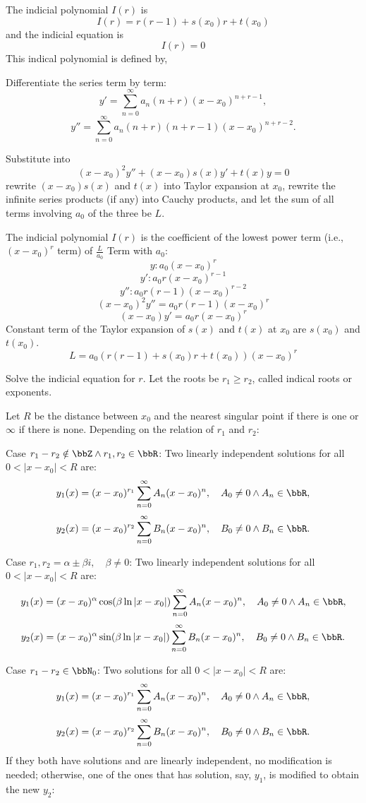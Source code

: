 \documentclass[a4paper,12pt]{report}
\begin{document}
\item The indicial polynomial $I(r)$ is
\[I(r)=r(r-1)+s(x_0)r+t(x_0)\]
and the indicial equation is
\[I(r)=0\]
This indical polynomial is defined by,
\bit
\item Differentiate the series term by term:
\[y'=\sum_{n=0}^{\infty}a_n(n+r)(x-x_0)^{n+r-1},\]
\[y''=\sum_{n=0}^{\infty}a_n(n+r)(n+r-1)(x-x_0)^{n+r-2}.\]
\item Substitute into
\[(x-x_0)^2y''+(x-x_0)s(x)y'+t(x)y=0\]
rewrite $(x-x_0)s(x)$ and $t(x)$ into Taylor expansion at $x_0$, rewrite the infinite series products (if any) into Cauchy products, and let the sum of all terms involving $a_0$ of the three be $L$.
\item The indicial polynomial $I(r)$ is the coefficient of the lowest power term (i.e., $(x-x_0)^r$ term) of $\frac{L}{a_0}$
\eit
\bpr
Term with $a_0$:
\[y\colon a_0(x-x_0)^r\]
\[y'\colon a_0r(x-x_0)^{r-1}\]
\[y''\colon a_0r(r-1)(x-x_0)^{r-2}\]
\[(x-x_0)^2y''=a_0r(r-1)(x-x_0)^r\]
\[(x-x_0)y'=a_0r(x-x_0)^r\]
Constant term of the Taylor expansion of $s(x)$ and $t(x)$ at $x_0$ are $s(x_0)$ and $t(x_0)$.
\[L=a_0(r(r-1)+s(x_0)r+t(x_0))(x-x_0)^r\]
\epr
\item Solve the indicial equation for $r$. Let the roots be $r_1\geq r_2$, called indical roots or exponents.
\item Let $R$ be the distance between $x_0$ and the nearest singular point if there is one or $\infty$ if there is none. Depending on the relation of $r_1$ and $r_2$:
\bit
\item Case $r_1-r_2\notin\bbZ\land r_1,r_2\in\bbR$: Two linearly independent solutions for all $0<|x-x_0|<R$ are:
\[y_1(x)=(x-x_0)^{r_1}\sum_{n=0}^{\infty}A_n(x-x_0)^n,\quad A_0\neq 0\land A_n\in\bbR,\]
\[y_2(x)=(x-x_0)^{r_2}\sum_{n=0}^{\infty}B_n(x-x_0)^n,\quad B_0\neq 0\land B_n\in\bbR.\]
\item Case $r_1,r_2=\alpha\pm\beta i,\quad\beta\ne0$: Two linearly independent solutions for all $0<|x-x_0|<R$ are:
\[y_1(x)=(x-x_0)^{\alpha}\cos(\beta\ln|x-x_0|)\sum_{n=0}^{\infty}A_n(x-x_0)^n,\quad A_0\neq 0\land A_n\in\bbR,\]
\[y_2(x)=(x-x_0)^{\alpha}\sin(\beta\ln|x-x_0|)\sum_{n=0}^{\infty}B_n(x-x_0)^n,\quad B_0\neq 0\land B_n\in\bbR.\]
\item Case $r_1-r_2\in\bbN_0$: Two solutions for all $0<|x-x_0|<R$ are:
\[y_1(x)=(x-x_0)^{r_1}\sum_{n=0}^{\infty}A_n(x-x_0)^n,\quad A_0\neq 0\land A_n\in\bbR,\]
\[y_2(x)=(x-x_0)^{r_2}\sum_{n=0}^{\infty}B_n(x-x_0)^n,\quad B_0\neq 0\land B_n\in\bbR.\]
If they both have solutions and are linearly independent, no modification is needed; otherwise, one of the ones that has solution, say, $y_1$, is modified to obtain the new $y_2$:
\end{document}
